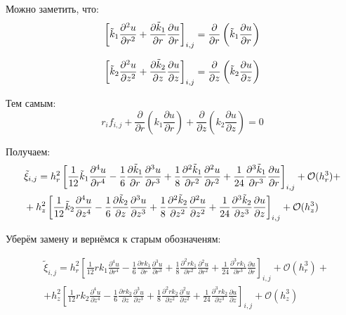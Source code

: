 Можно заметить, что:
\[
  \left[ \Tilde{k}_1 \frac{\partial^2 u}{\partial r^2} + \frac{\partial \Tilde{k}_1}{\partial r}\frac{\partial u}{\partial r} \right]_{i, j} =
  \frac{\partial}{\partial r} \left( \Tilde{k}_1 \frac{\partial u}{\partial r} \right)
\]

\[
  \left[ \Tilde{k}_2 \frac{\partial^2 u}{\partial z^2} + \frac{\partial \Tilde{k}_2}{\partial z} \frac{\partial u}{\partial z} \right]_{i, j} =
  \frac{\partial}{\partial z} \left( \Tilde{k}_2 \frac{\partial u}{\partial z} \right)
\]

Тем самым:
\[
  r_if_{i, j} + \frac{\partial}{\partial r} \left( k_1 \frac{\partial u}{\partial r} \right) +
  \frac{\partial}{\partial z} \left( k_2 \frac{\partial u}{\partial z} \right) = 0
\]

Получаем:
\begin{align*}
  &\tilde{\xi}_{i, j} = 
  h^2_r\left[ \frac{1}{12} \Tilde{k}_1 \frac{\partial^4 u}{\partial r^4} - \frac{1}{6}\frac{\partial \Tilde{k}_1}{\partial r}\frac{\partial^3 u}{\partial r^3}
  + \frac{1}{8} \frac{\partial^2 \Tilde{k}_1}{\partial r^2}\frac{\partial^2 u}{\partial r^2}
  + \frac{1}{24} \frac{\partial^3 \Tilde{k}_1}{\partial r^3}\frac{\partial u}{\partial r} \right]_{i,j} + \mathcal{O}(h_r^3) + \\
  &+ h^2_z \left[
    \frac{1}{12} \Tilde{k}_2 \frac{\partial^4 u}{\partial z^4} - \frac{1}{6} \frac{\partial \Tilde{k}_2}{\partial z} \frac{\partial^3 u}{\partial z^3}
    + \frac{1}{8} \frac{\partial^2 \Tilde{k}_2}{\partial z^2} \frac{\partial^2 u}{\partial z^2}
    + \frac{1}{24} \frac{\partial^3 \Tilde{k}_2}{\partial z^3} \frac{\partial u}{\partial z}
     \right]_{i, j} + \mathcal{O}(h_z^3)
\end{align*}

Уберём замену и вернёмся к старым обозначеням:

\begin{align*}
  &\tilde{\xi}_{i, j} = 
  h^2_r\left[ \frac{1}{12} r k_1 \frac{\partial^4 u}{\partial r^4} - \frac{1}{6}\frac{\partial r k_1}{\partial r}\frac{\partial^3 u}{\partial r^3}
  + \frac{1}{8} \frac{\partial^2 r k_1}{\partial r^2}\frac{\partial^2 u}{\partial r^2}
  + \frac{1}{24} \frac{\partial^3 r k_1}{\partial r^3}\frac{\partial u}{\partial r} \right]_{i,j} + \mathcal{O}(h_r^3) + \\
  &+ h^2_z \left[
    \frac{1}{12} r k_2 \frac{\partial^4 u}{\partial z^4} - \frac{1}{6} \frac{\partial r k_2}{\partial z} \frac{\partial^3 u}{\partial z^3}
    + \frac{1}{8} \frac{\partial^2 r k_2}{\partial z^2} \frac{\partial^2 u}{\partial z^2}
    + \frac{1}{24} \frac{\partial^3 r k_2}{\partial z^3} \frac{\partial u}{\partial z}
     \right]_{i, j} + \mathcal{O}(h_z^3)
\end{align*}

